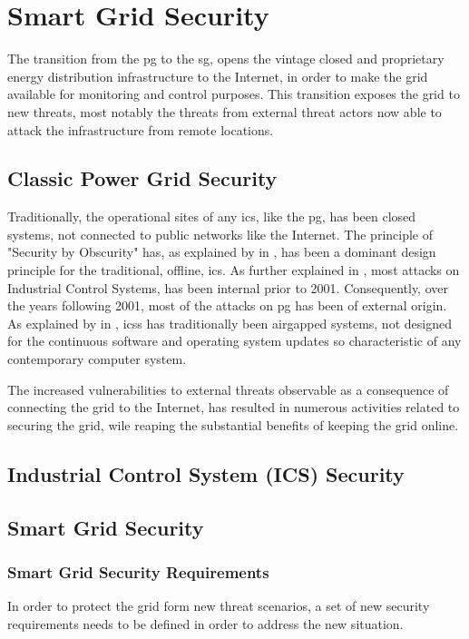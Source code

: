 \chapter{Smart Grid  Security}

The transition from the \acrlong{pg} to the \acrlong{sg}, opens the vintage closed and  proprietary energy distribution infrastructure to the Internet, in order to make the grid available for monitoring and control purposes. This transition exposes the grid to new threats, most notably the threats from external threat actors now able to attack the infrastructure from remote locations. 

\section{Classic Power Grid Security}
Traditionally, the operational sites of any \acrfull{ics}, like the \acrlong{pg}, has been closed systems, not connected to public networks like the Internet. 
The principle of "Security by Obscurity" has, as explained by  \citeauthor{humayed2017cyber}  in \cite{humayed2017cyber}, has been a dominant design principle for the traditional, offline, \acrlong{ics}.
As further explained  in \cite{humayed2017cyber}, most attacks on Industrial Control Systems, has been internal prior to 2001. Consequently, over the years following 2001, most of the attacks on \acrshort{pg} has been of external origin.
As explained by \citeauthor{knapp2015industrial} in \cite{knapp2015industrial}, \acrshort{ics}s has traditionally been airgapped systems, not designed for the continuous software and operating system updates so characteristic of any contemporary computer system. 

The increased vulnerabilities to external threats observable as a consequence of connecting the grid to the Internet, has resulted in numerous activities related to securing the grid, wile reaping the substantial benefits of keeping the grid online. 


\section{Industrial Control System (ICS) Security}

\section{Smart Grid  Security} 

\subsection{Smart Grid Security Requirements}
In order to protect the grid form new threat scenarios, a set of new security requirements needs to be defined in order to address the new situation. 
 
